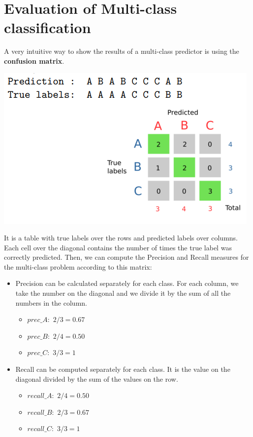 \section{Evaluation of Multi-class classification}
A very intuitive way to show the results of a multi-class predictor is using the \textbf{confusion matrix}.
\begin{flushleft}
    \includegraphics[]{images/Confusion matrix.png}
\end{flushleft}
It is a table with true labels over the rows and predicted labels over columns. Each cell over the diagonal contains the number of times the true label was correctly predicted.\newline\newline
Then, we can compute the Precision and Recall measures for the multi-class problem according to this matrix:
\begin{itemize}
    \item Precision can be calculated separately for each class. For each column, we take the number on the diagonal and we divide it by the sum of all the numbers in the column.
    \begin{itemize}
        \item $prec\_A: \,\, 2/3 = 0.67$
        \item $prec\_B: \,\, 2/4 = 0.50$
        \item $prec\_C: \,\, 3/3 = 1$
    \end{itemize}

    \item Recall can be computed separately for each class. It is the value on the diagonal divided by the sum of the values on the row.
    \begin{itemize}
        \item $recall\_A: \,\, 2/4 = 0.50$
        \item $recall\_B: \,\, 2/3 = 0.67$
        \item $recall\_C: \,\, 3/3 = 1$
    \end{itemize}
\end{itemize}
